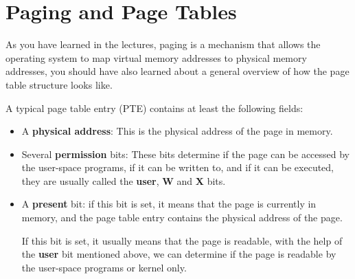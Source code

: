 \section{Paging and Page Tables}

As you have learned in the lectures, paging is a mechanism that allows the
operating system to map virtual memory addresses to physical memory addresses,
you should have also learned about a general overview of how the page table
structure looks like.

A typical page table entry (PTE) contains at least the following fields:

\begin{itemize}
    \item A \textbf{physical address}: This is the physical address of the page
          in memory.

    \item Several \textbf{permission} bits: These bits determine if the page
          can be accessed by the user-space programs, if it can be written to,
          and if it can be executed, they are usually called the \textbf{user},
          \textbf{W} and \textbf{X} bits.


    \item A \textbf{present} bit: if this bit is set, it means that the page
          is currently in memory, and the page table entry contains the physical
          address of the page.

          If this bit is set, it usually means that the page is readable, with
          the help of the \textbf{user} bit mentioned above, we can determine
          if the page is readable by the user-space programs or kernel only.

\end{itemize}


